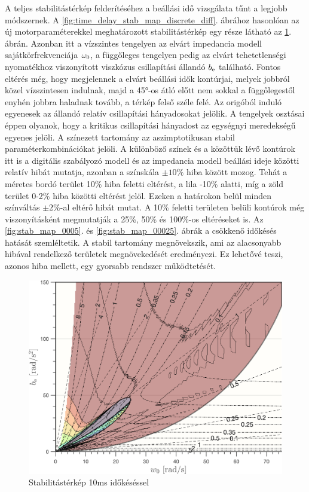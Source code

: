 A teljes stabilitástérkép felderítéséhez a beállási idő vizsgálata tűnt a legjobb módszernek. A \ref{fig:time_delay_stab_map_discrete_diff}. 
ábrához hasonlóan az új motorparaméterekkel meghatározott stabilitástérkép egy része látható az \ref{fig:stab_map_001}. ábrán.
Azonban itt a vízszintes tengelyen az elvárt impedancia modell sajátkörfrekvenciája \(\omega_{\mathrm{0}}\), a függőleges 
tengelyen pedig az elvárt tehetetlenségi nyomatékhoz viszonyított viszkózus csillapítási állandó \(b_{\mathrm{e}}\) található.
Fontos eltérés még, hogy megjelennek a elvárt beállási idők kontúrjai, melyek jobbról közel vízszintesen indulnak, 
majd a 45°-os átló előtt nem sokkal a függőlegestől enyhén jobbra haladnak tovább, a térkép felső széle felé. 
Az origóból induló egyenesek az állandó relatív csillapítási hányadosokat jelölik. A tengelyek osztásai éppen olyanok, 
hogy a kritikus csillapítási hányadost az egységnyi meredekségű egyenes jelöli. A színezett tartomány az aszimptotikusan 
stabil paraméterkombinációkat jelöli. A különböző színek és a közöttük lévő kontúrok itt is a digitális szabályozó modell és az 
impedancia modell beállási ideje közötti relatív hibát mutatja, azonban a színskála \(\pm 10\%\) hiba között mozog. 
Tehát a méretes bordó terület 10\% hiba feletti eltérést, a lila -10\% alatti, míg a zöld terület 0-2\% hiba közötti 
eltérést jelöl. Ezeken a határokon belül minden színváltás \(\pm2\%\)-al eltérő hibát mutat. A 10\% feletti 
területen belüli kontúrok még viszonyításként megmutatják a 25\%, 50\% és 100\%-os eltéréseket is. 
Az \ref{fig:stab_map_0005}. és \ref{fig:stab_map_00025}. ábrák a csökkenő időkésés hatását szemléltetik. 
A stabil tartomány megnövekszik, ami az alacsonyabb hibával rendelkező területek 
megnövekedését eredményezi. Ez lehetővé teszi, azonos hiba mellett, egy gyorsabb rendszer működtetését. 

\begin{figure}[b!]
    \begin{center}
    \includegraphics[width=14cm]{images/stab_map_001.png}
    \caption{Stabilitástérkép 10ms időkéséssel}\label{fig:stab_map_001}
    \end{center}
\end{figure}


